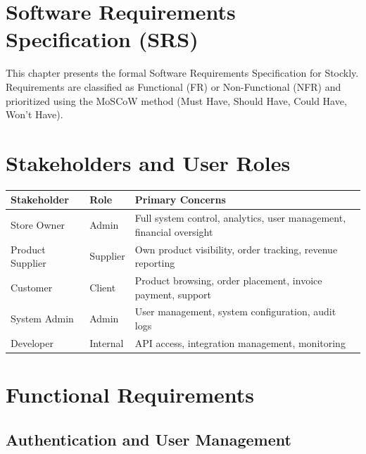 ﻿\documentclass[12pt,a4paper]{report}
\begin{document}
\section{Software Requirements Specification (SRS)}

This chapter presents the formal Software Requirements Specification for Stockly. Requirements are classified as Functional (FR) or Non-Functional (NFR) and prioritized using the MoSCoW method (Must Have, Should Have, Could Have, Won't Have).

\section{Stakeholders and User Roles}

\begin{center}
\begin{tabularx}{\textwidth}{llX}
  \toprule
  \textbf{Stakeholder} & \textbf{Role} & \textbf{Primary Concerns} \\
  \midrule
  Store Owner   & Admin    & Full system control, analytics, user management, financial oversight \\
  Product Supplier & Supplier & Own product visibility, order tracking, revenue reporting \\
  Customer      & Client   & Product browsing, order placement, invoice payment, support \\
  System Admin  & Admin    & User management, system configuration, audit logs \\
  Developer     & Internal & API access, integration management, monitoring \\
  \bottomrule
\end{tabularx}
\end{center}

\section{Functional Requirements}

\subsection{Authentication and User Management}
\end{document}
